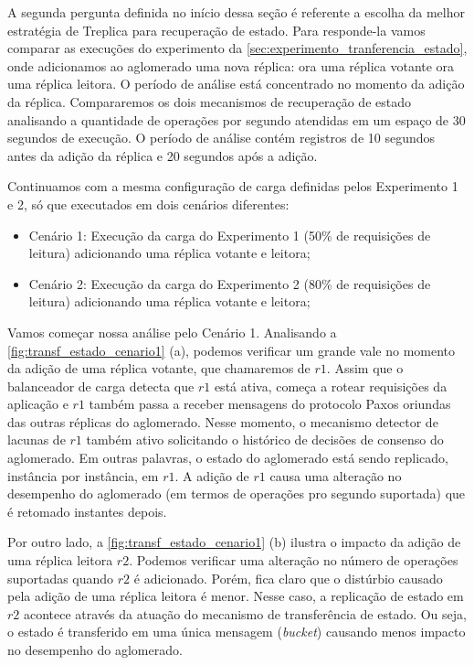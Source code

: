 A segunda pergunta definida no início dessa seção é referente a escolha da melhor
estratégia de Treplica para recuperação de estado. Para responde-la vamos comparar as
execuções do experimento da \autoref{sec:experimento_tranferencia_estado}, onde
adicionamos ao aglomerado uma nova réplica: ora uma réplica votante ora uma réplica
leitora. O período de análise está concentrado no momento da adição da réplica.
Compararemos os dois mecanismos de recuperação de estado analisando a quantidade de
operações por segundo atendidas em um espaço de 30 segundos de execução. O período de
análise contém registros de 10 segundos antes da adição da réplica e 20 segundos após a
adição.

Continuamos com a mesma configuração de carga definidas pelos Experimento 1 e 2, só que
executados em dois cenários diferentes:

\begin{itemize}
  \item Cenário 1: Execução da carga do Experimento 1 (50\% de requisições de leitura)
    adicionando uma réplica votante e leitora;
  \item Cenário 2: Execução da carga do Experimento 2 (80\% de requisições de leitura)
    adicionando uma réplica votante e leitora;
\end{itemize}

Vamos começar nossa análise pelo Cenário 1. Analisando a
\autoref{fig:transf_estado_cenario1} (a), podemos verificar um grande vale no momento da
adição de uma réplica votante, que chamaremos de $r1$. Assim que o balanceador de carga
detecta que $r1$ está ativa, começa a rotear requisições da aplicação e $r1$ também passa
a receber mensagens do protocolo Paxos oriundas das outras réplicas do aglomerado. Nesse
momento, o mecanismo detector de lacunas de $r1$ também ativo solicitando o histórico de
decisões de consenso do aglomerado. Em outras palavras, o estado do aglomerado está sendo
replicado, instância por instância, em $r1$. A adição de $r1$ causa uma alteração no
desempenho do aglomerado (em termos de operações pro segundo suportada) que é retomado
instantes depois.

Por outro lado, a \autoref{fig:transf_estado_cenario1} (b) ilustra o impacto da adição de
uma réplica leitora $r2$. Podemos verificar uma alteração no número de operações
suportadas quando $r2$ é adicionado. Porém, fica claro que o distúrbio causado pela
adição de uma réplica leitora é menor. Nesse caso, a replicação de estado em $r2$ acontece
através da atuação do mecanismo de transferência de estado. Ou seja, o estado é
transferido em uma única mensagem (\emph{bucket}) causando menos impacto no desempenho do
aglomerado.

